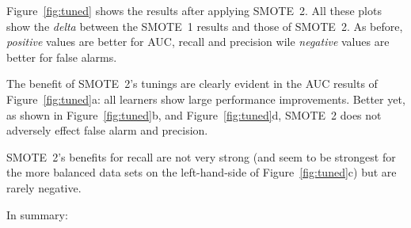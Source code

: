 Figure~\ref{fig:tuned} shows the results
after applying SMOTE~2. All these
plots show the {\em delta} between
the SMOTE~1 results and those of SMOTE~2.
As before, {\em positive}  values
are better for AUC, recall and precision
wile {\em negative} values are better for false alarms.

The benefit of SMOTE~2's tunings are clearly evident in the AUC results of  Figure~\ref{fig:tuned}a:
all learners show large performance improvements. 
Better yet,  as
shown in
Figure~\ref{fig:tuned}b, and Figure~\ref{fig:tuned}d, SMOTE~2 does
not adversely effect false alarm and precision.

SMOTE~2's benefits for recall are not very
strong (and seem to be strongest for the more balanced data sets on the left-hand-side of Figure~\ref{fig:tuned}c)
but are rarely negative.






In summary:

